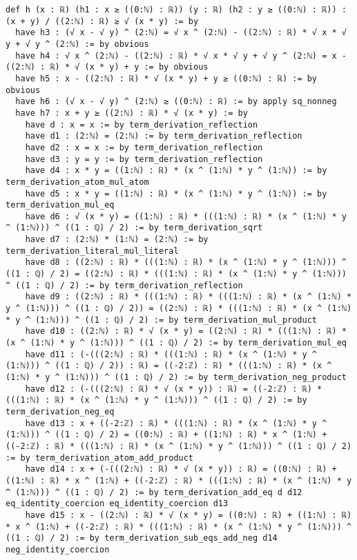\documentclass{article}
\begin{document}
\begin{tcolorbox}[colback=white!10, width=\linewidth]
\begin{lstlisting}[language=Lean4]
def h (x : ℝ) (h1 : x ≥ ((0:ℕ) : ℝ)) (y : ℝ) (h2 : y ≥ ((0:ℕ) : ℝ)) : (x + y) / ((2:ℕ) : ℝ) ≥ √ (x * y) := by
  have h3 : (√ x - √ y) ^ (2:ℕ) = √ x ^ (2:ℕ) - ((2:ℕ) : ℝ) * √ x * √ y + √ y ^ (2:ℕ) := by obvious
  have h4 : √ x ^ (2:ℕ) - ((2:ℕ) : ℝ) * √ x * √ y + √ y ^ (2:ℕ) = x - ((2:ℕ) : ℝ) * √ (x * y) + y := by obvious
  have h5 : x - ((2:ℕ) : ℝ) * √ (x * y) + y ≥ ((0:ℕ) : ℝ) := by obvious
  have h6 : (√ x - √ y) ^ (2:ℕ) ≥ ((0:ℕ) : ℝ) := by apply sq_nonneg
  have h7 : x + y ≥ ((2:ℕ) : ℝ) * √ (x * y) := by
    have d : x = x := by term_derivation_reflection
    have d1 : (2:ℕ) = (2:ℕ) := by term_derivation_reflection
    have d2 : x = x := by term_derivation_reflection
    have d3 : y = y := by term_derivation_reflection
    have d4 : x * y = ((1:ℕ) : ℝ) * (x ^ (1:ℕ) * y ^ (1:ℕ)) := by term_derivation_atom_mul_atom
    have d5 : x * y = ((1:ℕ) : ℝ) * (x ^ (1:ℕ) * y ^ (1:ℕ)) := by term_derivation_mul_eq
    have d6 : √ (x * y) = ((1:ℕ) : ℝ) * (((1:ℕ) : ℝ) * (x ^ (1:ℕ) * y ^ (1:ℕ))) ^ ((1 : ℚ) / 2) := by term_derivation_sqrt
    have d7 : (2:ℕ) * (1:ℕ) = (2:ℕ) := by term_derivation_literal_mul_literal
    have d8 : ((2:ℕ) : ℝ) * (((1:ℕ) : ℝ) * (x ^ (1:ℕ) * y ^ (1:ℕ))) ^ ((1 : ℚ) / 2) = ((2:ℕ) : ℝ) * (((1:ℕ) : ℝ) * (x ^ (1:ℕ) * y ^ (1:ℕ))) ^ ((1 : ℚ) / 2) := by term_derivation_reflection
    have d9 : ((2:ℕ) : ℝ) * (((1:ℕ) : ℝ) * (((1:ℕ) : ℝ) * (x ^ (1:ℕ) * y ^ (1:ℕ))) ^ ((1 : ℚ) / 2)) = ((2:ℕ) : ℝ) * (((1:ℕ) : ℝ) * (x ^ (1:ℕ) * y ^ (1:ℕ))) ^ ((1 : ℚ) / 2) := by term_derivation_mul_product
    have d10 : ((2:ℕ) : ℝ) * √ (x * y) = ((2:ℕ) : ℝ) * (((1:ℕ) : ℝ) * (x ^ (1:ℕ) * y ^ (1:ℕ))) ^ ((1 : ℚ) / 2) := by term_derivation_mul_eq
    have d11 : (-(((2:ℕ) : ℝ) * (((1:ℕ) : ℝ) * (x ^ (1:ℕ) * y ^ (1:ℕ))) ^ ((1 : ℚ) / 2)) : ℝ) = ((-2:ℤ) : ℝ) * (((1:ℕ) : ℝ) * (x ^ (1:ℕ) * y ^ (1:ℕ))) ^ ((1 : ℚ) / 2) := by term_derivation_neg_product
    have d12 : (-(((2:ℕ) : ℝ) * √ (x * y)) : ℝ) = ((-2:ℤ) : ℝ) * (((1:ℕ) : ℝ) * (x ^ (1:ℕ) * y ^ (1:ℕ))) ^ ((1 : ℚ) / 2) := by term_derivation_neg_eq
    have d13 : x + ((-2:ℤ) : ℝ) * (((1:ℕ) : ℝ) * (x ^ (1:ℕ) * y ^ (1:ℕ))) ^ ((1 : ℚ) / 2) = ((0:ℕ) : ℝ) + ((1:ℕ) : ℝ) * x ^ (1:ℕ) + ((-2:ℤ) : ℝ) * (((1:ℕ) : ℝ) * (x ^ (1:ℕ) * y ^ (1:ℕ))) ^ ((1 : ℚ) / 2) := by term_derivation_atom_add_product
    have d14 : x + (-(((2:ℕ) : ℝ) * √ (x * y)) : ℝ) = ((0:ℕ) : ℝ) + ((1:ℕ) : ℝ) * x ^ (1:ℕ) + ((-2:ℤ) : ℝ) * (((1:ℕ) : ℝ) * (x ^ (1:ℕ) * y ^ (1:ℕ))) ^ ((1 : ℚ) / 2) := by term_derivation_add_eq d d12 eq_identity_coercion eq_identity_coercion d13
    have d15 : x - ((2:ℕ) : ℝ) * √ (x * y) = ((0:ℕ) : ℝ) + ((1:ℕ) : ℝ) * x ^ (1:ℕ) + ((-2:ℤ) : ℝ) * (((1:ℕ) : ℝ) * (x ^ (1:ℕ) * y ^ (1:ℕ))) ^ ((1 : ℚ) / 2) := by term_derivation_sub_eqs_add_neg d14 neg_identity_coercion

\end{lstlisting}
\end{tcolorbox}
\end{document}
